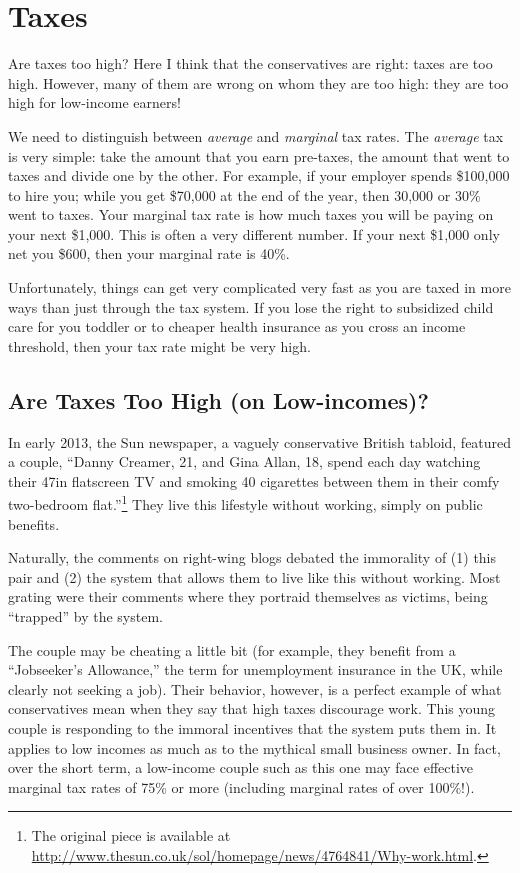 \chapter{Taxes}%
\label{chpt:taxes}

Are taxes too high? Here I think that the conservatives are right: taxes are
too high. However, many of them are wrong on whom they are too high: they are
too high for low-income earners!

We need to distinguish between \emph{average} and \emph{marginal} tax rates.
The \emph{average} tax is very simple: take the amount that you earn pre-taxes,
the amount that went to taxes and divide one by the other. For example, if your
employer spends \$100,000 to hire you; while you get \$70,000 at the end of the
year, then 30,000 or 30\% went to taxes. Your marginal tax rate is how much
taxes you will be paying on your next \$1,000. This is often a very different
number. If your next \$1,000 only net you \$600, then your marginal rate is
40\%. %

Unfortunately, things can get very complicated very fast as you are taxed in
more ways than just through the tax system. If you lose the right to subsidized
child care for you toddler or to cheaper health insurance as you cross an
income threshold, then your tax rate might be very high.

\section{Are Taxes Too High (on Low-incomes)?}

In early 2013, the Sun newspaper, a vaguely conservative British tabloid,
featured a couple, ``Danny Creamer, 21, and Gina Allan, 18, spend each day
watching their 47in flatscreen TV and smoking 40 cigarettes between them in
their comfy two-bedroom flat.''\footnote{The original piece is available at
\url{http://www.thesun.co.uk/sol/homepage/news/4764841/Why-work.html}.} They
live this lifestyle without working, simply on public benefits.

Naturally, the comments on right-wing blogs debated the immorality of (1) this
pair and (2) the system that allows them to live like this without working.
Most grating were their comments where they portraid themselves as victims,
being ``trapped'' by the system.

The couple may be cheating a little bit (for example, they benefit from a
``Jobseeker's Allowance,'' the term for unemployment insurance in the UK, while
clearly not seeking a job). Their behavior, however, is a perfect example of
what conservatives mean when they say that high taxes discourage work. This
young couple is responding to the immoral incentives that the system puts them
in. It applies to low incomes as much as to the mythical small business owner.
In fact, over the short term, a low-income couple such as this one may face
effective marginal tax rates of 75\% or more (including marginal rates of over
100\%!).

